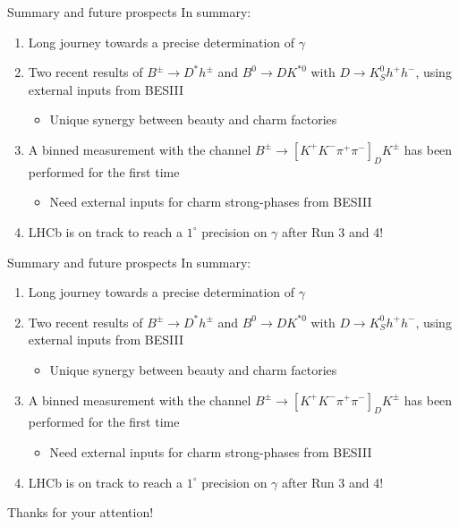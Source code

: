 \documentclass[dvipsnames]{beamer}
\begin{document}
\begin{frame}{Summary and future prospects}
  \vspace{0.0cm}
  {\Large In summary:}
  \vspace{0.3cm}
  \begin{enumerate}
    \setlength\itemsep{1.0em}
    \item{Long journey towards a precise determination of $\gamma$}
    \item{Two recent results of $B^\pm\to D^*h^\pm$ and $B^0\to DK^{*0}$ with $D\to K_S^0h^+h^-$, using external inputs from BESIII}
    \begin{itemize}
      \item{Unique synergy between beauty and charm factories}
    \end{itemize}
    \item{A binned measurement with the channel $B^\pm\to[K^+K^-\pi^+\pi^-]_DK^\pm$ has been performed for the first time}
    \begin{itemize}
      \item{Need external inputs for charm strong-phases from BESIII}
    \end{itemize}
    \item{LHCb is on track to reach a $1^\circ$ precision on $\gamma$ after Run 3 and 4!}
  \end{enumerate}
  \vspace{0.4cm}
  \begin{center}
    {\huge \phantom{Thanks for your attention!}}
  \end{center}
\end{frame}

\begin{frame}{Summary and future prospects}
  \vspace{0.0cm}
  {\Large In summary:}
  \vspace{0.3cm}
  \begin{enumerate}
    \setlength\itemsep{1.0em}
    \item{Long journey towards a precise determination of $\gamma$}
    \item{Two recent results of $B^\pm\to D^*h^\pm$ and $B^0\to DK^{*0}$ with $D\to K_S^0h^+h^-$, using external inputs from BESIII}
    \begin{itemize}
      \item{Unique synergy between beauty and charm factories}
    \end{itemize}
    \item{A binned measurement with the channel $B^\pm\to[K^+K^-\pi^+\pi^-]_DK^\pm$ has been performed for the first time}
    \begin{itemize}
      \item{Need external inputs for charm strong-phases from BESIII}
    \end{itemize}
    \item{LHCb is on track to reach a $1^\circ$ precision on $\gamma$ after Run 3 and 4!}
  \end{enumerate}
  \vspace{0.4cm}
  \begin{center}
    {\huge Thanks for your attention!}
  \end{center}
\end{frame}
\end{document}
